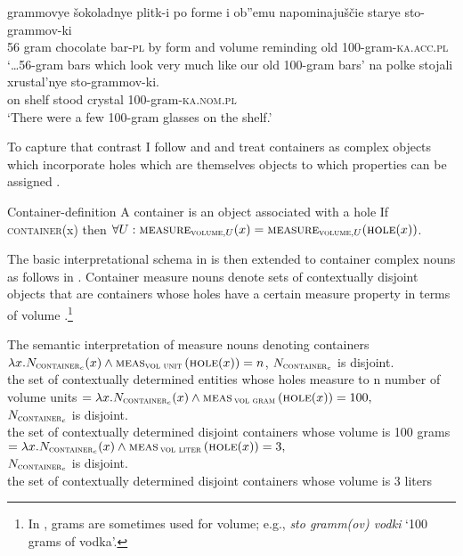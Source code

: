 \documentclass[output=paper]{langscibook}
\begin{document}
\ea\label{ex:khrizmann:20}
    \ea\label{ex:khrizmann:20a}  grammovye šokoladnye plitk-i po forme i ob''emu napominajuščie starye sto-grammov-ki\\
    56 gram chocolate bar-\textsc{pl} by form and volume reminding old 100-gram-\textsc{ka.acc.pl}\\
    \glt `\dots 56-gram bars which look very much like our old 100-gram bars'
    \ex\label{ex:khrizmann:20b} \gll na polke stojali xrustal'nye sto-grammov-ki.\\
    on shelf stood crystal 100-gram-\textsc{ka.nom.pl}\\
    \glt `There were a few 100-gram glasses on the shelf.'
\z\z

\noindent To capture that contrast I follow \citet{Casati.Varzi1999} and \citet{Rothstein2009,Rothstein2017} and treat containers as complex objects which incorporate holes which are themselves objects to which properties can be assigned .


\ea\label{ex:khrizmann:21} Container-definition \hfill \citep[218]{Rothstein2017}
    \ea\label{ex:khrizmann:21a} A container is an object associated with a hole
    \ex\label{ex:khrizmann:21b} If \textsc{container}(x) then $\forall U: \textsc{measure}_{\textsc{volume},U}(x) = \textsc{measure}_{\textsc{volume},U}(\textsc{hole}(x))$.
\z\z

\noindent The basic interpretational schema in  is then extended to container complex nouns as follows in . Container measure nouns denote sets of contextually disjoint objects that are containers whose holes have a certain measure property in terms of volume .\footnote{In , grams are sometimes used for volume; e.g., \textit{sto gramm(ov) vodki} `100 grams of vodka'.}

\ea\label{ex:khrizmann:22} The semantic interpretation of measure nouns denoting containers\\
$\lambda x. N_{\textsc{container}_{c}} (x) \wedge \textsc{meas}_{\textsc{vol unit}}\,(\textsc{hole}(x)) = n$, {$N_{\textsc{container}_{c}}$ is disjoint.\\
the set of contextually determined entities whose holes measure to n number of volume units}
\ex\label{ex:khrizmann:23}
    \ea\label{ex:khrizmann:23a}  $= \lambda x. N_{\textsc{container}_{c}}(x) \wedge \textsc{meas}\,_{\textsc{vol gram}}\,(\textsc{hole}(x)) = 100,$\\
    \hspace{7.8em} {$N_{\textsc{container}_{c}}$ is disjoint. \\
    the set of contextually determined disjoint containers whose volume is 100 grams}
    \ex\label{ex:khrizmann:23b}  $= \lambda x. N_{\textsc{container}_{c}}(x) \wedge \textsc{meas}\,_{\textsc{vol liter}}\,(\textsc{hole}(x)) = 3,$\\
    \hspace{6.4em} {$N_{\textsc{container}_{c}}$ is disjoint.\\
    the set of contextually determined disjoint containers whose volume is 3 liters}
\z\z
\end{document}
